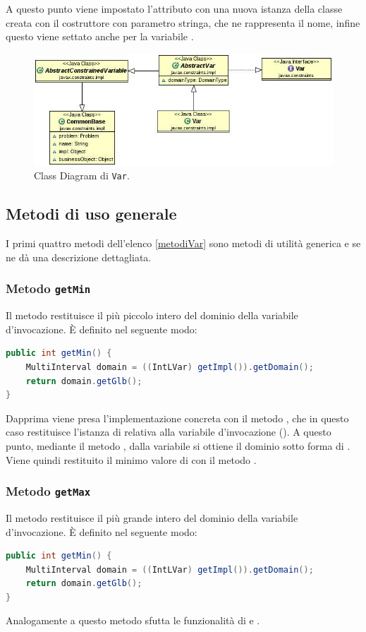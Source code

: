 A questo punto viene impostato l'attributo  con una nuova istanza
della classe  creata con il costruttore con parametro stringa,
che ne rappresenta il nome, infine questo
viene settato anche per la variabile .

\begin{figure}[!ht]\label{varUML}
\centering
\includegraphics[scale=.5]{img/Var.JPG}
\caption{Class Diagram di \texttt{Var}.}
\end{figure}

\subsection{Metodi di uso generale}
I primi quattro metodi dell'elenco \ref{metodiVar} sono metodi di utilità 
generica e se ne dà una descrizione dettagliata.
\subsubsection{Metodo \texttt{getMin}}
Il metodo  restituisce il più piccolo intero del dominio
della variabile d'invocazione. \`E definito nel seguente modo:
\begin{lstlisting}[language = Java,
                   caption = {\files{getMin}.}]
public int getMin() {
	MultiInterval domain = ((IntLVar) getImpl()).getDomain();
	return domain.getGlb();
}
\end{lstlisting}
Dapprima viene presa l'implementazione concreta con il metodo ,
che in questo caso restituisce l'istanza di  relativa alla
variabile d'invocazione (). A questo punto, mediante il metodo 
,
dalla variabile si ottiene il dominio sotto forma di .
Viene quindi restituito il minimo valore di  con il
metodo .

\subsubsection{Metodo \texttt{getMax}}
Il metodo  restituisce il più grande intero del dominio
della variabile d'invocazione. \`E definito nel seguente modo:
\begin{lstlisting}[language = Java,
                   caption = {\files{getMax}.}]
public int getMin() {
	MultiInterval domain = ((IntLVar) getImpl()).getDomain();
	return domain.getGlb();
}
\end{lstlisting}
Analogamente a  questo metodo sfutta le funzionalità di
 e .

